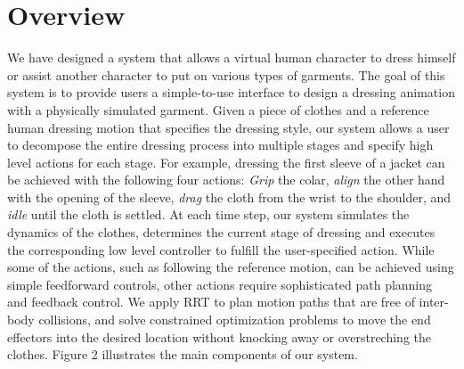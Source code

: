 \section{Overview}

We have designed a system that allows a virtual human character to dress himself or assist another character to put on various types of garments. The
goal of this system is to provide users a simple-to-use interface to design a dressing animation with a physically simulated garment.
Given a piece of clothes and a reference human dressing motion that specifies the dressing style, our system allows a user to decompose the entire
dressing process into multiple stages and specify high level actions for each stage. For example, dressing the first sleeve of a jacket can be achieved with
the following four actions: \emph{Grip} the colar, \emph{align} the other hand with the opening of the sleeve,
\emph{drag} the cloth from the wrist to the shoulder, and \emph{idle} until the cloth is settled.
At each time step, our system simulates the dynamics of the clothes, determines the current stage of dressing and executes the corresponding low level controller
to fulfill the user-specified action. While some of the actions, such as following the reference motion, can be achieved using simple feedforward controls,
other actions require sophisticated path planning and feedback control. We apply RRT to plan motion paths that are free of inter-body collisions, and solve constrained
optimization problems to move the end effectors into the desired location without knocking away or overstreching the clothes.
Figure 2 illustrates the main components of our system. 





